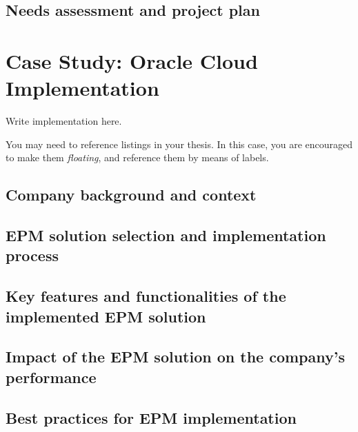 \documentclass[12pt,a4paper,openright,twoside]{book}
\begin{document}
\section{Needs assessment and project plan}

\chapter{Case Study: Oracle Cloud Implementation}
\label{chap:implementation}

Write implementation here.

You may need to reference listings in your thesis.
%
In this case, you are encouraged to make them \emph{floating}, and reference them by means of labels.

\section{Company background and context}

\section{EPM solution selection and implementation process}

\section{Key features and functionalities of the implemented EPM solution}

\section{Impact of the EPM solution on the company's performance}

\section{Best practices for EPM implementation}

\chapter{\conclusionsname}
\label{chap:conclusions}
\end{document}
